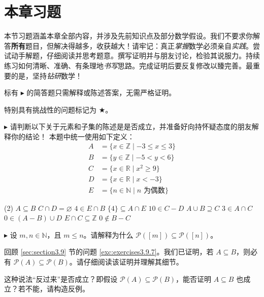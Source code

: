 \section{本章习题}

本节习题涵盖本章全部内容，并涉及先前知识点及部分数学假设。我们不要求你解答\textbf{所有}题目，但解决得越多，收获越大！请牢记：真正\emph{掌握}数学必须亲自\emph{实践}。尝试动手解题，仔细阅读并思考题意。撰写证明并与朋友讨论，检验其说服力。持续练习如何清晰、准确、有条理地\emph{书写}思路。完成证明后要反复修改以臻完善。最重要的是，坚持\emph{钻研}数学！

标有 $\blacktriangleright$ 的简答题只需解释或陈述答案，无需严格证明。

特别具有挑战性的问题标记为 $\bigstar$。\\

\begin{exercise}
    $\blacktriangleright$ 请判断以下关于元素和子集的陈述是是否成立，并准备好向持怀疑态度的朋友解释你的结论！
    本题中统一使用如下定义：
    \begin{align*}
        A &= \{x \in \mathbb{Z} \mid -3 \le x \le 3\} \\
        B &= \{y \in \mathbb{Z} \mid -5 < y < 6\} \\
        C &= \{x \in \mathbb{R} \mid x^2 \ge 9\} \\
	    D &= \{x \in \mathbb{R} \mid x < -3\} \\
        E &= \{n \in \mathbb{N} \mid n \text{\ 为偶数} \}
    \end{align*}
    \begin{tasks}(2)
        \task $A \subseteq B$
        \task $C \cap D = \varnothing$
        \task $4 \in E \cap B$
        \task $\{4\} \subseteq A \cap E$
        \task $10 \in C - D$
        \task $A \cup B \supseteq C$
        \task $3 \in A \cap C$
        \task $0 \in (A - B) \cup D$
        \task $E \cap C \subseteq \mathbb{Z}$
        \task $0 \notin B - C$
    \end{tasks}
\end{exercise}

\begin{exercise}
    $\blacktriangleright$ 设 $m, n \in \mathbb{N}$，且 $m \le n$。请解释为什么 $\mathcal{P}([m]) \subseteq \mathcal{P}([n])$。
\end{exercise}

\begin{exercise}
    回顾 \ref{sec:section3.9} 节的问题 \ref{exc:exercises3.9.7}。我们已证明，若 $A \subseteq B$，则必有 $\mathcal{P}(A) \subseteq \mathcal{P}(B)$。请仔细阅读该证明并理解其细节。

    这种说法``反过来''是否成立？即假设 $\mathcal{P}(A) \subseteq \mathcal{P}(B)$，能否证明 $A \subseteq B$ 也成立？若不能，请构造反例。
\end{exercise}

